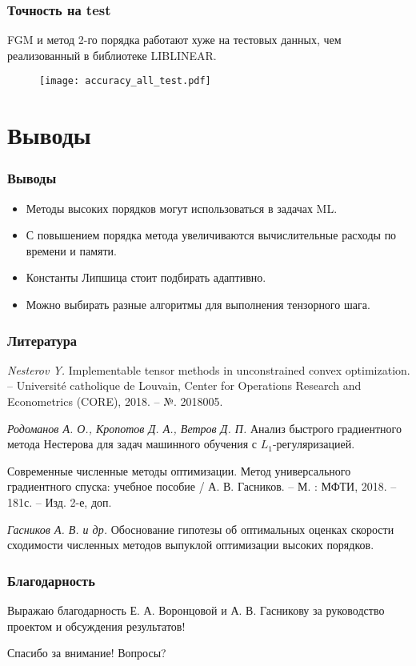 \documentclass[12pt]{beamer}
\begin{document}
\begin{frame}
\frametitle{Точность на test}
FGM и метод 2-го порядка работают хуже на тестовых данных, чем реализованный в библиотеке LIBLINEAR.
\begin{figure}
	\texttt{[image: accuracy\_all\_test.pdf]}
\end{figure}
\end{frame}

\section{Выводы}
\begin{frame}
\frametitle{Выводы}
\begin{itemize}
	\item Методы высоких порядков могут использоваться в задачах ML.
	\item С повышением порядка метода увеличиваются вычислительные расходы по времени и памяти.
	\item Константы Липшица стоит подбирать адаптивно.
	\item Можно выбирать разные алгоритмы для выполнения тензорного шага.
\end{itemize}
\end{frame}



\begin{frame}
\frametitle{Литература}

\begin{thebibliography}{0}
	
	\emph{Nesterov Y.} Implementable tensor methods in unconstrained convex optimization. – Université catholique de Louvain, Center for Operations Research and Econometrics (CORE), 2018. – №. 2018005.
	
	\emph{Родоманов А. О., Кропотов Д. А., Ветров Д. П.} Анализ быстрого градиентного метода Нестерова для задач машинного обучения с $L_1$-регуляризацией.
	
	Современные численные методы оптимизации. Метод универсального градиентного спуска: учебное пособие / А. В. Гасников. – М. : МФТИ, 2018. –	181с. –	Изд. 2-е, доп.
	
	\emph{Гасников А. В. и др.} Обоснование гипотезы
	об оптимальных оценках скорости сходимости численных методов выпуклой оптимизации высоких порядков.
	
\end{thebibliography}
\end{frame}

\begin{frame}
\frametitle{Благодарность}
Выражаю благодарность Е. А. Воронцовой и А. В. Гасникову за руководство проектом и обсуждения результатов!
\end{frame}

\begin{frame}
\Huge{\centerline{Спасибо за внимание! Вопросы?}}
\end{frame}
\end{document}
